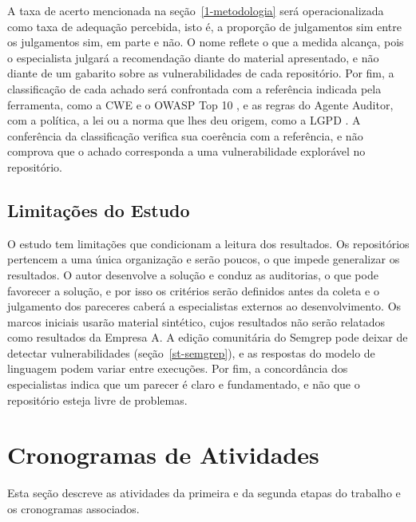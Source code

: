 A taxa de acerto mencionada na seção~\ref{1-metodologia} será operacionalizada como taxa de adequação percebida, isto é, a proporção de julgamentos sim entre os julgamentos sim, em parte e não. O nome reflete o que a medida alcança, pois o especialista julgará a recomendação diante do material apresentado, e não diante de um gabarito sobre as vulnerabilidades de cada repositório. Por fim, a classificação de cada achado será confrontada com a referência indicada pela ferramenta, como a CWE e o OWASP Top 10 \cite{cweAbout,owaspTop10}, e as regras do Agente Auditor, com a política, a lei ou a norma que lhes deu origem, como a LGPD \cite{lgpd2018}. A conferência da classificação verifica sua coerência com a referência, e não comprova que o achado corresponda a uma vulnerabilidade explorável no repositório.

\subsection{Limitações do Estudo}
\label{met-limitacoes}

O estudo tem limitações que condicionam a leitura dos resultados. Os repositórios pertencem a uma única organização e serão poucos, o que impede generalizar os resultados. O autor desenvolve a solução e conduz as auditorias, o que pode favorecer a solução, e por isso os critérios serão definidos antes da coleta e o julgamento dos pareceres caberá a especialistas externos ao desenvolvimento. Os marcos iniciais usarão material sintético, cujos resultados não serão relatados como resultados da Empresa A. A edição comunitária do Semgrep pode deixar de detectar vulnerabilidades (seção~\ref{st-semgrep}), e as respostas do modelo de linguagem podem variar entre execuções. Por fim, a concordância dos especialistas indica que um parecer é claro e fundamentado, e não que o repositório esteja livre de problemas.

\section{Cronogramas de Atividades}
\label{met-cronogramas}

Esta seção descreve as atividades da primeira e da segunda etapas do trabalho e os cronogramas associados.


